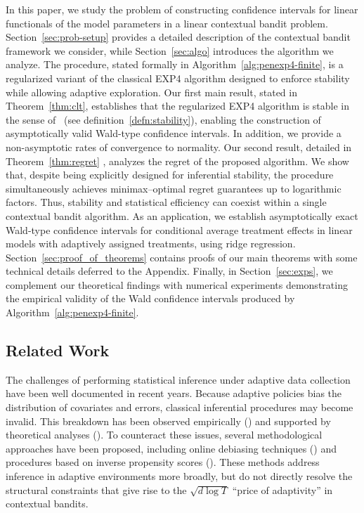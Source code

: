 \documentclass[11pt,letterpaper]{article}
\theoremstyle{plain}
\theoremstyle{definition}  %
\begin{document}
In this paper, we study the problem of constructing confidence intervals for linear functionals of the model parameters in a linear contextual bandit problem. Section~\ref{sec:prob-setup} provides a
detailed description of the contextual bandit framework we consider, while
Section~\ref{sec:algo} introduces the algorithm we analyze. The procedure, stated formally in
Algorithm~\ref{alg:penexp4-finite}, is a regularized variant of the classical EXP4 algorithm designed
to enforce stability while allowing adaptive exploration.
Our first main result, stated in Theorem~\ref{thm:clt}, establishes that the regularized EXP4 algorithm is
stable in the sense of~\cite{lai1982least} (see definition~\eqref{defn:stability}), enabling the
construction of asymptotically valid Wald-type confidence intervals. In addition, we provide a non-asymptotic rates of convergence to normality. Our second result, detailed in Theorem~\ref{thm:regret} , analyzes the regret of the proposed algorithm. We show
that, despite being explicitly designed for inferential stability, the procedure simultaneously
achieves minimax--optimal regret guarantees up to logarithmic factors. Thus, stability and
statistical efficiency can coexist within a single contextual bandit algorithm. As an application, we establish asymptotically exact Wald-type confidence intervals for conditional average treatment effects in linear models with adaptively assigned treatments, using ridge regression. Section~\ref{sec:proof_of_theorems} contains proofs of our main theorems with some technical details deferred to the Appendix.  Finally, in Section~\ref{sec:exps}, we complement our theoretical findings with numerical
experiments demonstrating the empirical validity of the Wald confidence intervals produced by
Algorithm~\ref{alg:penexp4-finite}.



\subsection{Related Work}

\noindent
The challenges of performing statistical inference under adaptive data collection have been
well documented in recent years. Because adaptive policies bias the distribution of covariates and
errors, classical inferential procedures may become invalid. This breakdown has been observed
empirically (\citet{xu2013estimation,villar2015multi}) and supported by theoretical analyses
(\citet{nie2018adaptively,shin2019sample,shin2021bias}). To counteract these issues, several
methodological approaches have been proposed, including online debiasing techniques
(\citet{khamaru2021near,chen2022debiasing,kim2023double}) and procedures based on inverse
propensity scores (\citet{hadad2021confidence,deshpande2018accurate,zhang2022statistical,
nair2023randomization,leiner2025adaptive}).  
These methods address inference in adaptive environments more broadly, but do not directly
resolve the structural constraints that give rise to the $\sqrt{d \log T}$ ``price of adaptivity'' in
contextual bandits.
\end{document}
